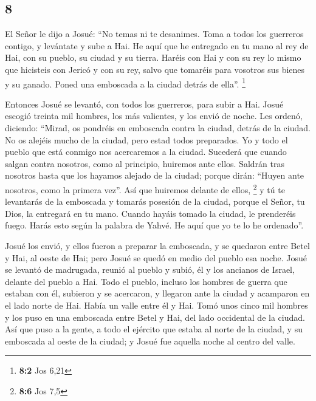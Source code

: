 \begin{paracol}{2}
\hypertarget{section-14}{%
\section{8}\label{section-14}}

 El Señor le dijo a Josué: ``No temas ni te desanimes.
Toma a todos los guerreros contigo, y levántate y sube a Hai. He aquí
que he entregado en tu mano al rey de Hai, con su pueblo, su ciudad y su
tierra.  Haréis con Hai y con su rey lo mismo que
hicisteis con Jericó y con su rey, salvo que tomaréis para vosotros sus
bienes y su ganado. Poned una emboscada a la ciudad detrás de ella''.
\footnote{\textbf{8:2} Jos 6,21}

 Entonces Josué se levantó, con todos los guerreros, para
subir a Hai. Josué escogió treinta mil hombres, los más valientes, y los
envió de noche.  Les ordenó, diciendo: ``Mirad, os
pondréis en emboscada contra la ciudad, detrás de la ciudad. No os
alejéis mucho de la ciudad, pero estad todos preparados. 
Yo y todo el pueblo que está conmigo nos acercaremos a la ciudad.
Sucederá que cuando salgan contra nosotros, como al principio, huiremos
ante ellos.  Saldrán tras nosotros hasta que los hayamos
alejado de la ciudad; porque dirán: ``Huyen ante nosotros, como la
primera vez''. Así que huiremos delante de ellos, \footnote{\textbf{8:6}
  Jos 7,5}  y tú te levantarás de la emboscada y tomarás
posesión de la ciudad, porque el Señor, tu Dios, la entregará en tu
mano.  Cuando hayáis tomado la ciudad, le prenderéis
fuego. Harás esto según la palabra de Yahvé. He aquí que yo te lo he
ordenado''.

 Josué los envió, y ellos fueron a preparar la emboscada,
y se quedaron entre Betel y Hai, al oeste de Hai; pero Josué se quedó en
medio del pueblo esa noche.  Josué se levantó de
madrugada, reunió al pueblo y subió, él y los ancianos de Israel,
delante del pueblo a Hai.  Todo el pueblo, incluso los
hombres de guerra que estaban con él, subieron y se acercaron, y
llegaron ante la ciudad y acamparon en el lado norte de Hai. Había un
valle entre él y Hai.  Tomó unos cinco mil hombres y los
puso en una emboscada entre Betel y Hai, del lado occidental de la
ciudad.  Así que puso a la gente, a todo el ejército que
estaba al norte de la ciudad, y su emboscada al oeste de la ciudad; y
Josué fue aquella noche al centro del valle.


\end{paracol}
